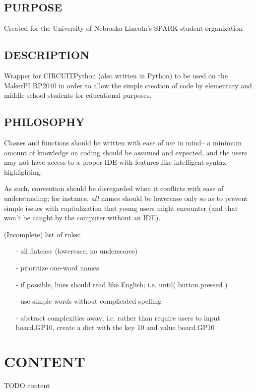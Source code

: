 \documentclass[12pt]{scrartcl} %
\begin{document}
\subsection{PURPOSE}

Created for the University of Nebraska-Lincoln's SPARK student organization

\subsection{DESCRIPTION}

Wrapper for CIRCUITPython (also written in Python) to be used on the MakerPI
RP2040 in order to allow the simple creation of code by elementary and middle
school students for educational purposes.

\subsection{PHILOSOPHY}

Classes and functions should be written with ease of use in mind-- a minimum
amount of knowledge on coding should be assumed and expected, and the users may
not have access to a proper IDE with features like intelligent syntax
highlighting.

As such, convention should be disregarded when it conflicts with ease of
understanding; for instance, \emph{all} names should be lowercase only so as to
prevent simple issues with capitalization that young users might encounter (and
that won't be caught by the computer without an IDE).

(Incomplete) list of rules:

\begin{itemize}
  \item[-] all flatcase (lowercase, no underscores)
  \item[-] prioritize one-word names
  \item[-] if possible, lines should read like English; i.e. until( button.pressed )
  \item[-] use simple words without complicated spelling
  \item[-] abstract complexities away; i.e. rather than require users to input
    board.GP10, create a dict with the key 10 and value board.GP10
\end{itemize}

\newpage

\section{CONTENT}
\label{section:detailedDesignDescription}

TODO content

\end{document}
